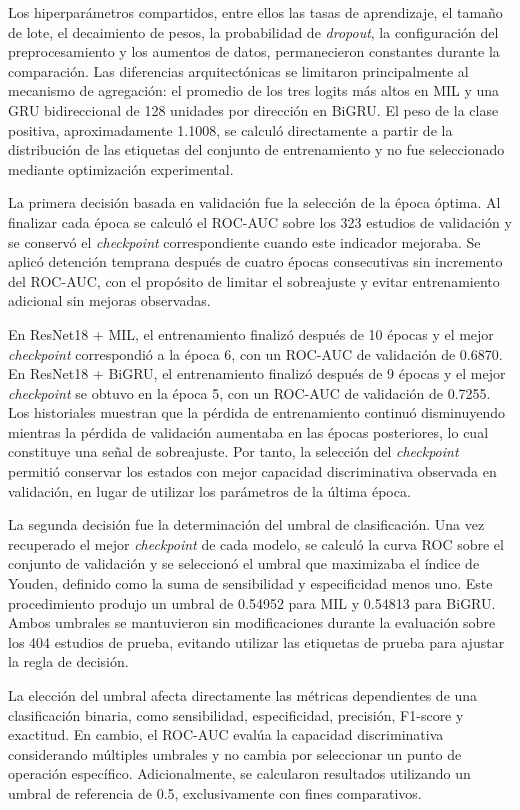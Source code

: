 Los hiperparámetros compartidos, entre ellos las tasas de aprendizaje, el tamaño de lote, el decaimiento de pesos, la probabilidad de \textit{dropout}, la configuración del preprocesamiento y los aumentos de datos, permanecieron constantes durante la comparación. Las diferencias arquitectónicas se limitaron principalmente al mecanismo de agregación: el promedio de los tres logits más altos en MIL y una GRU bidireccional de 128 unidades por dirección en BiGRU. El peso de la clase positiva, aproximadamente 1.1008, se calculó directamente a partir de la distribución de las etiquetas del conjunto de entrenamiento y no fue seleccionado mediante optimización experimental.

La primera decisión basada en validación fue la selección de la época óptima. Al finalizar cada época se calculó el ROC-AUC sobre los 323 estudios de validación y se conservó el \textit{checkpoint} correspondiente cuando este indicador mejoraba. Se aplicó detención temprana después de cuatro épocas consecutivas sin incremento del ROC-AUC, con el propósito de limitar el sobreajuste y evitar entrenamiento adicional sin mejoras observadas.

En ResNet18 + MIL, el entrenamiento finalizó después de 10 épocas y el mejor \textit{checkpoint} correspondió a la época 6, con un ROC-AUC de validación de 0.6870. En ResNet18 + BiGRU, el entrenamiento finalizó después de 9 épocas y el mejor \textit{checkpoint} se obtuvo en la época 5, con un ROC-AUC de validación de 0.7255. Los historiales muestran que la pérdida de entrenamiento continuó disminuyendo mientras la pérdida de validación aumentaba en las épocas posteriores, lo cual constituye una señal de sobreajuste. Por tanto, la selección del \textit{checkpoint} permitió conservar los estados con mejor capacidad discriminativa observada en validación, en lugar de utilizar los parámetros de la última época.

La segunda decisión fue la determinación del umbral de clasificación. Una vez recuperado el mejor \textit{checkpoint} de cada modelo, se calculó la curva ROC sobre el conjunto de validación y se seleccionó el umbral que maximizaba el índice de Youden, definido como la suma de sensibilidad y especificidad menos uno. Este procedimiento produjo un umbral de 0.54952 para MIL y 0.54813 para BiGRU. Ambos umbrales se mantuvieron sin modificaciones durante la evaluación sobre los 404 estudios de prueba, evitando utilizar las etiquetas de prueba para ajustar la regla de decisión.

La elección del umbral afecta directamente las métricas dependientes de una clasificación binaria, como sensibilidad, especificidad, precisión, F1-score y exactitud. En cambio, el ROC-AUC evalúa la capacidad discriminativa considerando múltiples umbrales y no cambia por seleccionar un punto de operación específico. Adicionalmente, se calcularon resultados utilizando un umbral de referencia de 0.5, exclusivamente con fines comparativos.

